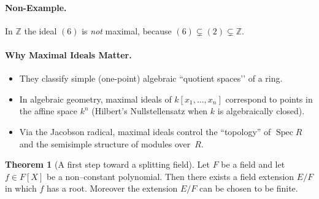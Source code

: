 \documentclass[12pt]{article}
\theoremstyle{definition} %
\newtheorem{theorem}{Theorem}
\theoremstyle{plain} %
\begin{document}
\medskip
\paragraph{Non-Example.}
In \(\mathbb{Z}\) the ideal \((6)\) is \emph{not} maximal,
because \((6)\subsetneq(2)\subsetneq\mathbb{Z}\).

\medskip
\paragraph{Why Maximal Ideals Matter.}
\begin{itemize}
  \item They classify simple (one-point) algebraic “quotient spaces’’
        of a ring.
  \item In algebraic geometry, maximal ideals of
        \(k[x_{1},\dots,x_{n}]\) correspond to points in the affine space
        \(k^{n}\) (Hilbert’s Nullstellensatz when \(k\) is algebraically closed).
  \item Via the Jacobson radical, maximal ideals control the “topology”
        of \(\operatorname{Spec} R\) and the semisimple structure of
        modules over~\(R\).
\end{itemize}
\begin{theorem}[A first step toward a splitting field]
  Let \(F\) be a field and let \(f\in F[X]\) be a non–constant polynomial.
  Then there exists a field extension \(E/F\) in which \(f\) has a root.
  Moreover the extension \(E/F\) can be chosen to be finite.
  \end{theorem}
  
\end{document}
